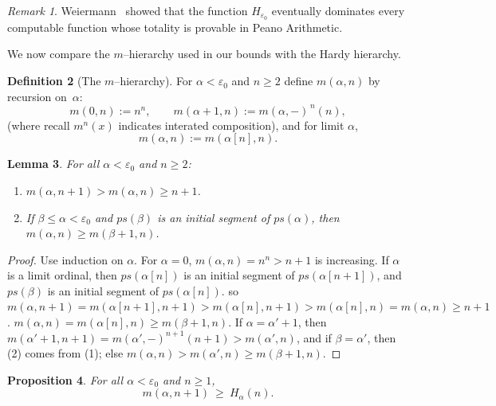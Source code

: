 \documentclass{article}
\newtheorem{lemma}{Lemma}[section]
\newtheorem{proposition}[lemma]{Proposition}
\theoremstyle{definition}
\newtheorem{definition}[lemma]{Definition}
\theoremstyle{remark}
\newtheorem{remark}[lemma]{Remark}
\begin{document}
\begin{remark}\label{rmk:Weiermann-cite}
Weiermann~\cite{Weiermann} showed that the function $H_{\varepsilon_0}$ {eventually dominates} every computable function whose totality is provable in Peano Arithmetic. 
\end{remark}

We now compare the $m$–hierarchy used in our bounds with the Hardy hierarchy.

\begin{definition}[The $m$–hierarchy]\label{def:m-alpha-n}
For $\alpha<\varepsilon_0$ and $n\ge 2$ define $m(\alpha,n)$ by recursion on~$\alpha$:
\[
m(0,n):=n^n,\qquad
m(\alpha+1,n):= m(\alpha,-)^{\,n}(n),
\]
(where recall $m^n(x)$ indicates interated composition), and for limit $\alpha$,
\[
m(\alpha,n):= m(\alpha[n],n).
\]
\end{definition}

\begin{lemma}\label{lem:m-basic}
For all $\alpha<\varepsilon_0$ and $n\ge 2$:
\begin{enumerate}
\item\label{it:monotone-n} $m(\alpha,n+1)>m(\alpha,n)\ge n+1$.
\item\label{it:monotone-alpha} If $\beta\le\alpha<\varepsilon_0$ and $ps(\beta)$ is an initial segment of $ps(\alpha)$, then $m(\alpha,n)\ge m(\beta+1,n)$.
\end{enumerate}
\end{lemma}

\begin{proof}
Use induction on $\alpha$. For $\alpha=0$, $m(\alpha,n)=n^n>n+1$ is increasing. If $\alpha$ is a limit ordinal, then $ps(\alpha[n])$ is an initial segment of $ps(\alpha[n+1])$, and $ps(\beta)$ is an initial segment of $ps(\alpha[n])$. so $m(\alpha,n+1)=m(\alpha[n+1],n+1)>m(\alpha[n],n+1)>m(\alpha[n],n)=m(\alpha,n)\ge n+1$. $m(\alpha,n)=m(\alpha[n],n)\ge m(\beta+1,n)$. If $\alpha=\alpha'+1$, then $m(\alpha'+1,n+1)=m(\alpha',-)^{n+1}(n+1)>m(\alpha',n)$, and if $\beta=\alpha'$, then (2) comes from (1); else $m(\alpha,n)>m(\alpha',n)\ge m(\beta+1,n)$.
\end{proof}

\begin{proposition}\label{prop:m-lower-bounds-H}
For all $\alpha<\varepsilon_0$ and $n\ge 1$,
\[
m(\alpha,n+1)\ \ge\ H_\alpha(n).
\]
\end{proposition}
\end{document}
